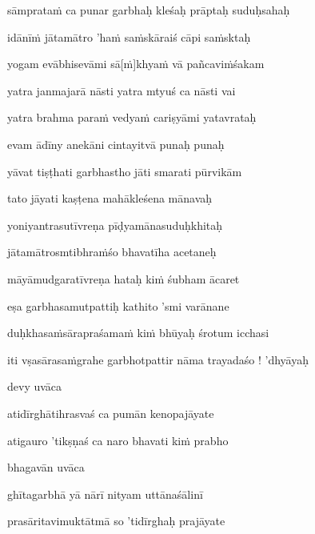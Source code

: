 sāmprataṁ ca punar garbhaḥ kleśaḥ prāptaḥ suduḥsahaḥ\thinspace{\dandab} \dontdisplaylinenum

idānīṁ jātamātro 'haṁ saṁskāraiś cāpi saṁsktaḥ \veg\dontdisplaylinenum

yogam evābhisevāmi sā[ṁ]khyaṁ vā pañcaviṁśakam\thinspace{\dandab} \dontdisplaylinenum

yatra janmajarā nāsti yatra mtyuś ca nāsti vai \veg\dontdisplaylinenum

yatra brahma paraṁ vedyaṁ cariṣyāmi yatavrataḥ\thinspace{\dandab} \dontdisplaylinenum

evam ādīny anekāni cintayitvā punaḥ punaḥ \veg\dontdisplaylinenum

yāvat tiṣṭhati garbhastho jāti smarati pūrvikām\thinspace{\dandab} \dontdisplaylinenum

tato jāyati kaṣṭena mahākleśena mānavaḥ \veg\dontdisplaylinenum

yoniyantrasutīvreṇa pīḍyamānasuduḥkhitaḥ\thinspace{\dandab} \dontdisplaylinenum

jātamātrosmtibhraṁśo bhavatīha acetaneḥ \veg\dontdisplaylinenum

māyāmudgaratīvreṇa hataḥ kiṁ śubham ācaret\thinspace{\dandab} \dontdisplaylinenum

eṣa garbhasamutpattiḥ kathito 'smi varānane \danda\dontdisplaylinenum

duḥkhasaṁsārapraśamaṁ kiṁ bhūyaḥ śrotum icchasi \veg\dontdisplaylinenum


\jump
\begin{center}
\ketdanda iti vṣasārasaṁgrahe garbhotpattir nāma trayadaśo ! 'dhyāyaḥ\ketdanda
\end{center}
\dontdisplaylinenum\vers 
\bekveg\szamveg\vfill\phpspagebreak\szam\bek{}
\thispagestyle{empty}


\vers


\jump\jump 
devy uvāca~{\dandab}\dontdisplaylinenum 

atidīrghātihrasvaś ca pumān kenopajāyate\thinspace{\danda} \dontdisplaylinenum

atigauro 'tikṣṇaś ca naro bhavati kiṁ prabho \veg\dontdisplaylinenum

bhagavān uvāca~{\dandab}\dontdisplaylinenum 

ghītagarbhā yā nārī nityam uttānaśālinī\thinspace{\danda} \dontdisplaylinenum

prasāritavimuktātmā so 'tidīrghaḥ prajāyate \veg\dontdisplaylinenum

